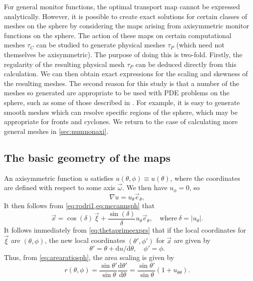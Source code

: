 \documentclass[11pt, a4paper]{scrartcl}  %
\theoremstyle{plain}
\theoremstyle{definition}
\numberwithin{equation}{section}
\newcommand{\dd}[2]{\frac{\mathrm{d} #1}{\mathrm{d} #2}}
\begin{document}
For general monitor functions, the optimal transport map cannot be
expressed analytically. However, it is possible to create exact
solutions for certain classes of meshes on the sphere by considering the
maps arising from axisymmetric monitor functions on the sphere. The
action of these maps on certain computational meshes $\tau_C$ can be
studied to generate physical meshes $\tau_P$ (which need not themselves
be axisymmetric). The purpose of doing this is two-fold. Firstly, the
regularity of the resulting physical mesh $\tau_P$ can be deduced
directly from this calculation. We can then obtain exact expressions for
the scaling and skewness of the resulting meshes. The second reason for
this study is that a number of the meshes so generated are appropriate
to be used with PDE problems on the sphere, such as some of those
described in \citet{slingo2009developing}. For example, it is easy to
generate smooth meshes which can resolve specific regions of the sphere,
which may be appropriate for fronts and cyclones.  We return to the case
of calculating more general meshes in \cref{sec:numnonaxi}.

\subsection{The basic geometry of the maps}

An axisymmetric function $u$ satisfies $u(\theta,\phi) \equiv u(\theta)$,
where the coordinates are defined with respect to some axis
$\vec{\omega}$. We then have $u_\phi = 0$, so
\begin{equation}
\label{eq:graduaxi}
  \nabla u = u_\theta \vec{e}_\theta,
\end{equation}
It then follows from \cref{eq:rodri1,eq:mccannsph} that
\begin{equation}
\label{eq:mccannaxi}
\vec{x} = \cos(\delta) \, \vec{\xi} + \frac{\sin(\delta)}{\delta} u_\theta \vec{e}_\theta, \quad\mbox{where}\ \delta = |u_\theta|.
\end{equation}
It follows immediately from \cref{eq:thetaprimeexprs} that if the local
coordinates for $\vec{\xi}$ are $(\theta, \phi)$, the new local
coordinates $(\theta', \phi')$ for $\vec{x}$ are given by
\begin{equation}
\label{eq:thetaprimeaxi}
\theta' = \theta +  \mathrm{d}u/\mathrm{d}\theta, \quad \phi' = \phi.
\end{equation}
Thus, from \cref{eq:arearatiosph}, the area scaling is given by
\begin{equation}
\label{eq:areaaxi}
r(\theta, \phi) = \frac{\sin\theta'}{\sin\theta} \dd{\theta'}{\theta} = \frac{\sin\theta'}{\sin\theta} (1 + u_{\theta \theta}).
\end{equation}
\end{document}
